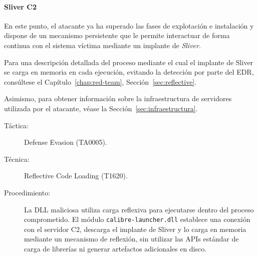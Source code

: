 \paragraph{Sliver C2} En este punto, el atacante ya ha superado las fases de explotación e instalación y dispone de un mecanismo persistente que le permite interactuar de forma continua con el sistema víctima mediante un implante de \textit{Sliver}.

Para una descripción detallada del proceso mediante el cual el implante de Sliver se carga en memoria en cada ejecución, evitando la detección por parte del EDR, consúltese el Capítulo~\ref{chap:red-team}, Sección~\ref{sec:reflective}. 

Asimismo, para obtener información sobre la infraestructura de servidores utilizada por el atacante, véase la Sección~\ref{sec:infraestructura}.

\begin{leftbar}
    \begin{description}
        \item[Táctica:] Defense Evasion (TA0005).
        \item[Técnica:] Reflective Code Loading (T1620).
        \item[Procedimiento:] La DLL maliciosa utiliza carga reflexiva para ejecutarse dentro del proceso comprometido. El módulo \texttt{calibre-launcher.dll} establece una conexión con el servidor C2, descarga el implante de Sliver y lo carga en memoria mediante un mecanismo de reflexión, sin utilizar las APIs estándar de carga de librerías ni generar artefactos adicionales en disco.
    \end{description}
\end{leftbar}

